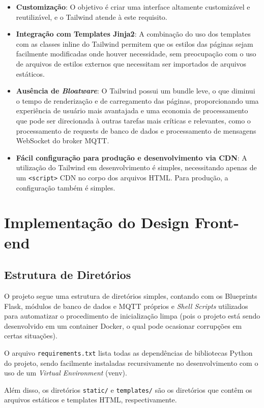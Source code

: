 \documentclass[11pt]{article}
\begin{document}
\begin{itemize}
\item \textbf{Customização}: O objetivo é criar uma interface altamente customizável e reutilizável, e o Tailwind atende à este requisito.
\item \textbf{Integração com Templates Jinja2}: A combinação do uso dos templates com as classes inline do Tailwind permitem que os estilos das páginas sejam facilmente modificadas onde houver necessidade, sem preocupação com o uso de arquivos de estilos externos que necessitam ser importados de arquivos estáticos.
\item \textbf{Ausência de \textit{Bloatware}}: O Tailwind possui um bundle leve, o que diminui o tempo de renderização e de carregamento das páginas, proporcionando uma experiência de usuário mais avantajada e uma economia de processamento que pode ser direcionada à outras tarefas mais críticas e relevantes, como o processamento de requests de banco de dados e processamento de mensagens WebSocket do broker MQTT.
\item \textbf{Fácil configuração para produção e desenvolvimento via CDN}: A utilização do Tailwind em desenvolvimento é simples, necessitando apenas de um \texttt{<script>} CDN no corpo dos arquivos HTML. Para produção, a configuração também é simples.
\end{itemize}

\section{Implementação do Design Front-end}

\subsection{Estrutura de Diretórios}

O projeto segue uma estrutura de diretórios simples, contando com os Blueprints Flask, módulos de banco de dados e MQTT próprios e \textit{Shell Scripts} utilizados para automatizar o procedimento de inicialização limpa (pois o projeto está sendo desenvolvido em um container Docker, o qual pode ocasionar corrupções em certas situações).

O arquivo \texttt{requirements.txt} lista todas as dependências de bibliotecas Python do projeto, sendo facilmente instaladas recursivamente no desenvolvimento com o uso de um \textit{Virtual Environment} (venv).

Além disso, os diretórios \texttt{static/} e \texttt{templates/} são os diretórios que contêm os arquivos estáticos e templates HTML, respectivamente.
\end{document}
